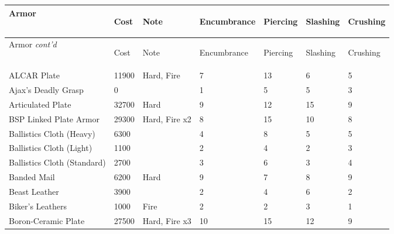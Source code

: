 \documentclass[twoside]{book}
\begin{document}
\begin{longtable}{p{1.25in}llp{2em}p{2em}p{2em}p{2em}} 
  Armor& \begin{turn}{70}{Cost}\end{turn}
          & \begin{turn}{70}{Note}\end{turn}
          & \begin{turn}{70}{Encumbrance}\end{turn}
          & \begin{turn}{70}{Piercing}\end{turn}
          & \begin{turn}{70}{Slashing}\end{turn}
          & \begin{turn}{70}{Crushing}\end{turn}
          \\
  \hline
  \hline
  \endfirsthead
  Armor \textit{cont'd}
        & \begin{turn}{70}{Cost}\end{turn}
          & \begin{turn}{70}{Note}\end{turn}
          & \begin{turn}{70}{Encumbrance}\end{turn}
          & \begin{turn}{70}{Piercing}\end{turn}
          & \begin{turn}{70}{Slashing}\end{turn}
          & \begin{turn}{70}{Crushing}\end{turn}
           \\
  \hline
  \endhead
\raggedright ALCAR Plate&11900&Hard, Fire&7&13&6&5\tabularnewline
      \raggedright Ajax's Deadly Grasp&0&&1&5&5&3\tabularnewline
      \raggedright Articulated Plate&32700&Hard&9&12&15&9\tabularnewline
      \raggedright BSP Linked Plate Armor&29300&Hard, Fire x2&8&15&10&8\tabularnewline
      \raggedright Ballistics Cloth (Heavy)&6300&&4&8&5&5\tabularnewline
      \raggedright Ballistics Cloth (Light)&1100&&2&4&2&3\tabularnewline
      \raggedright Ballistics Cloth (Standard)&2700&&3&6&3&4\tabularnewline
      \raggedright Banded Mail&6200&Hard&9&7&8&9\tabularnewline
      \raggedright Beast Leather&3900&&2&4&6&2\tabularnewline
      \raggedright Biker's Leathers&1000&Fire&2&2&3&1\tabularnewline
      \raggedright Boron-Ceramic Plate&27500&Hard, Fire x3&10&15&12&9\tabularnewline

\end{longtable}
\end{document}
